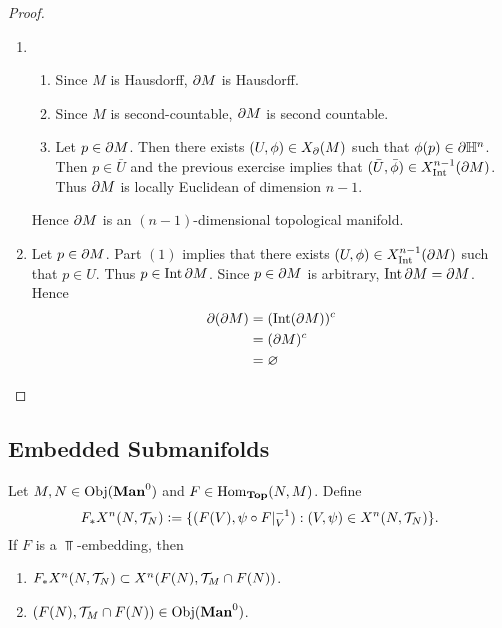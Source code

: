 \documentclass{book}
\begin{document}
\begin{proof}\
	\begin{enumerate}
		\item 
		\begin{enumerate}
			\item Since $M$ is Hausdorff, $\partial M$ is Hausdorff.
			\item Since $M$ is second-countable, $\partial M$ is second countable. 
			\item Let $p \in \partial M$. Then there exists $(U, \phi) \in X_{\partial}(M)$ such that $\phi(p) \in \partial \mathbb{H}^n$. Then $p \in \bar{U}$ and the previous exercise implies that $(\bar{U}, \bar{\phi}) \in X^{n-1}_{\operatorname{Int}}(\partial M)$. Thus $\partial M$ is locally Euclidean of dimension $n-1$.
		\end{enumerate}
		Hence $\partial M$ is an $(n-1)$-dimensional topological manifold.
		\item Let $p \in \partial M$. Part $(1)$ implies that there exists $(U, \phi) \in X^{n-1}_{\operatorname{Int}}(\partial M)$ such that $p \in U$. Thus $p \in \operatorname{Int} \partial M$. Since $p \in \partial M$ is arbitrary, $\operatorname{Int} \partial M = \partial M$. Hence 
		\begin{align*}
			\partial (\partial M)
			& = (\operatorname{Int}(\partial M))^c \\
			& = (\partial M)^c \\
			& = \varnothing
		\end{align*} 
	\end{enumerate}
\end{proof}








































\subsection{Embedded Submanifolds}

\begin{ex} 
	Let $M, N \in \Obj(\Man0)$ and $F \in \operatorname{Hom}_{\operatorname*{\text{\textbf{Top}}}}(N, M)$. Define 
	$$F_*X^n(N, \mathcal{T}_N) \vcentcolon= \{(F(V), \psi \circ F|_V^{-1}): (V, \psi) \in X^n(N, \mathcal{T}_N)\}.$$ 
	If $F$ is a $\Top$-embedding, then 
	\begin{enumerate}
		\item $F_*X^n(N, \mathcal{T}_N) \subset X^n(F(N), \mathcal{T}_M \cap F(N))$.
		\item $(F(N), \MT_M \cap F(N)) \in \Obj(\Man0)$.
	\end{enumerate}
\end{ex}
\end{document}
